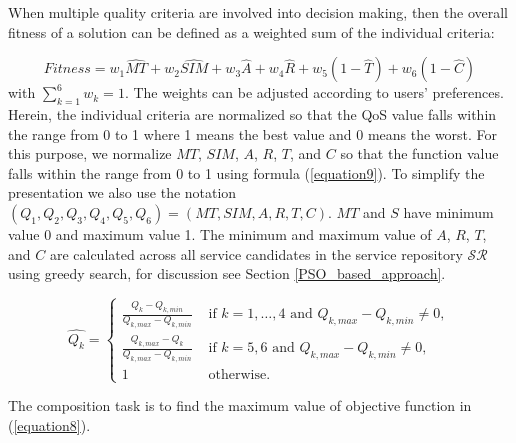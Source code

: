 \documentclass{llncs}
\begin{document}

\noindent When multiple quality criteria are involved into decision making, then the overall fitness of a solution can be defined as a weighted sum of the individual criteria: 

\begin{equation}
\label{equation8}
Fitness = w_1 \hat{MT} + w_2 \hat{SIM} + w_3 \hat{A} + w_4 \hat{R} + w_5(1 - \hat{T}) + w_6(1 - \hat{C})
\end{equation}
\noindent with $\sum_{k=1}^{6} w_k= 1$. The weights can be adjusted according to users' preferences. Herein, the individual criteria are normalized so that the QoS value falls within the range from 0 to 1 where 1 means the best value and 0 means the worst. For this purpose, we normalize $MT$, $SIM$, $A$, $R$, $T$, and $C$ so that the function value falls within the range from 0 to 1 using formula (\ref{equation9}). To simplify the presentation we also use the notation $(Q_1,Q_2,Q_3,Q_4,Q_5,Q_6) = (MT,SIM,A,R,T,C)$. $MT$ and $S$ have minimum value 0 and maximum value 1. The minimum and maximum value of $A$, $R$, $T$, and $C$ are calculated across all service candidates in the service repository $\mathcal{SR}$ using greedy search, for discussion see Section \ref{PSO_based_approach}.

\begin{equation}
\label{equation9}
\hat{Q_k} = 
\begin{cases}
	\frac{Q_k - Q_{k, min}}{Q_{k, max} - Q_{k, min}} & \text{ if $k=1,\ldots,4$ and }Q_{k, max} - Q_{k, min} \neq 0,\\
	\frac{Q_{k,max} - Q_k}{Q_{k, max} - Q_{k, min}} & \text{ if $k=5,6$ and }Q_{k, max} - Q_{k, min} \neq 0,\\
	1 & \text{ otherwise}.
\end{cases}
\end{equation}

\noindent The composition task is to find the maximum value of objective function in (\ref{equation8}).

\end{document}
